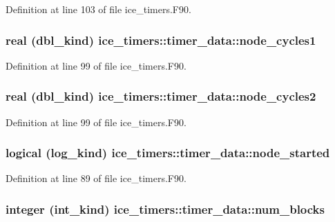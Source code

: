 Definition at line 103 of file ice\_\-timers.F90.\hypertarget{typeice__timers_1_1timer__data_a19ab81d8f8b96be1b52ba66f397061d2}{
\subsubsection[{node\_\-cycles1}]{\setlength{\rightskip}{0pt plus 5cm}real (dbl\_\-kind) {\bf ice\_\-timers::timer\_\-data::node\_\-cycles1}}}
\label{typeice__timers_1_1timer__data_a19ab81d8f8b96be1b52ba66f397061d2}


Definition at line 99 of file ice\_\-timers.F90.\hypertarget{typeice__timers_1_1timer__data_acd4bc3626fc916e013bde71bad54be75}{
\subsubsection[{node\_\-cycles2}]{\setlength{\rightskip}{0pt plus 5cm}real (dbl\_\-kind) {\bf ice\_\-timers::timer\_\-data::node\_\-cycles2}}}
\label{typeice__timers_1_1timer__data_acd4bc3626fc916e013bde71bad54be75}


Definition at line 99 of file ice\_\-timers.F90.\hypertarget{typeice__timers_1_1timer__data_a6a6b881e84dfd7cbfb6ccffd1b1e65a1}{
\subsubsection[{node\_\-started}]{\setlength{\rightskip}{0pt plus 5cm}logical (log\_\-kind) {\bf ice\_\-timers::timer\_\-data::node\_\-started}}}
\label{typeice__timers_1_1timer__data_a6a6b881e84dfd7cbfb6ccffd1b1e65a1}


Definition at line 89 of file ice\_\-timers.F90.\hypertarget{typeice__timers_1_1timer__data_a8a3b41c5452006ccf1ea62b0f47c6246}{
\subsubsection[{num\_\-blocks}]{\setlength{\rightskip}{0pt plus 5cm}integer (int\_\-kind) {\bf ice\_\-timers::timer\_\-data::num\_\-blocks}}}
\label{typeice__timers_1_1timer__data_a8a3b41c5452006ccf1ea62b0f47c6246}


